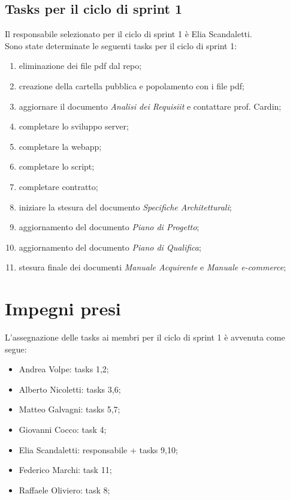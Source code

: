 \documentclass[a4paper, 12pt]{article}
\begin{document}
\subsection{Tasks per il ciclo di sprint 1}
Il responsabile selezionato per il ciclo di sprint 1 è Elia Scandaletti. \\
Sono state determinate le seguenti tasks per il ciclo di sprint 1:
\begin{enumerate}
	\item eliminazione dei file pdf dal repo;
	\item creazione della cartella pubblica e popolamento con i file pdf;
	\item aggiornare il documento \textit{Analisi dei Requisiit} e contattare prof. Cardin;
	\item completare lo sviluppo server;
	\item completare la webapp;
	\item completare lo script;
	\item completare contratto;
	\item iniziare la stesura del documento \textit{Specifiche Architetturali};
	\item aggiornamento del documento \textit{Piano di Progetto};
	\item aggiornamento del documento \textit{Piano di Qualifica};
	\item stesura finale dei documenti \textit{Manuale Acquirente} e \textit{Manuale e-commerce}; \\

\end{enumerate}

\section{Impegni presi}
L'assegnazione delle tasks ai membri per il ciclo di sprint 1 è avvenuta come segue:
\begin{itemize}
	\item Andrea Volpe: tasks 1,2;
	\item Alberto Nicoletti: tasks 3,6;
	\item Matteo Galvagni: tasks 5,7;
	\item Giovanni Cocco: task 4;
	\item Elia Scandaletti: responsabile + tasks 9,10;
	\item Federico Marchi: task 11;
	\item Raffaele Oliviero: task 8;
\end{itemize}


\begin{itemize}

\end{itemize}
\end{document}
